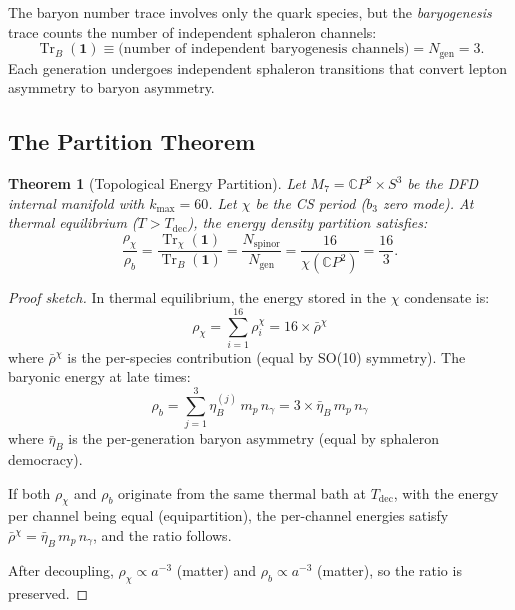 \documentclass[11pt]{article}
\newtheorem{theorem}{Theorem}[section]
\theoremstyle{definition}
\theoremstyle{remark}
\newcommand{\CP}{\mathbb{C}P}
\newcommand{\Tr}{\operatorname{Tr}}
\begin{document}
The baryon number trace involves only the quark species, but the
\emph{baryogenesis} trace counts the number of independent sphaleron
channels:
\begin{equation}
  \Tr_B(\mathbf{1}) \equiv
  \text{(number of independent baryogenesis channels)} = N_\mathrm{gen} = 3.
\end{equation}
Each generation undergoes independent sphaleron transitions that convert
lepton asymmetry to baryon asymmetry.

\subsection{The Partition Theorem}

\begin{theorem}[Topological Energy Partition]
\label{thm:partition}
Let $M_7 = \CP^2 \times S^3$ be the DFD internal manifold with
$k_\mathrm{max} = 60$. Let $\chi$ be the CS period ($b_3$ zero mode).
At thermal equilibrium ($T > T_\mathrm{dec}$), the energy density partition
satisfies:
\begin{equation}
  \frac{\rho_\chi}{\rho_b}
  = \frac{\Tr_\chi(\mathbf{1})}{\Tr_B(\mathbf{1})}
  = \frac{N_\mathrm{spinor}}{N_\mathrm{gen}}
  = \frac{16}{\chi(\CP^2)} = \frac{16}{3}.
\end{equation}
\end{theorem}

\begin{proof}[Proof sketch]
In thermal equilibrium, the energy stored in the $\chi$ condensate is:
\begin{equation}
  \rho_\chi = \sum_{i=1}^{16} \rho_i^\chi
  = 16 \times \bar\rho^\chi
\end{equation}
where $\bar\rho^\chi$ is the per-species contribution (equal by SO(10) symmetry).
The baryonic energy at late times:
\begin{equation}
  \rho_b = \sum_{j=1}^{3} \eta_B^{(j)}\,m_p\,n_\gamma
  = 3 \times \bar\eta_B\,m_p\,n_\gamma
\end{equation}
where $\bar\eta_B$ is the per-generation baryon asymmetry (equal by sphaleron
democracy).

If both $\rho_\chi$ and $\rho_b$ originate from the same thermal bath at
$T_\mathrm{dec}$, with the energy per channel being equal (equipartition),
the per-channel energies satisfy $\bar\rho^\chi = \bar\eta_B\,m_p\,n_\gamma$,
and the ratio follows.

After decoupling, $\rho_\chi \propto a^{-3}$ (matter) and
$\rho_b \propto a^{-3}$ (matter), so the ratio is preserved.
\end{proof}
\end{document}
